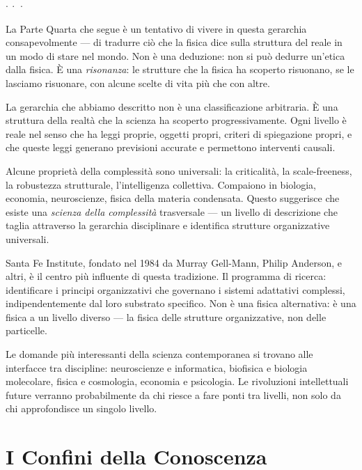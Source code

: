 \documentclass[12pt,a4paper,openany]{book}
\newcommand{\sezione}[1]{\vspace{1.2em}{\large\bfseries #1}\vspace{0.5em}\par}
\newcommand{\puntini}{\begin{center}$\cdot\ \cdot\ \cdot$\end{center}\vspace{0.3em}}
\begin{document}
\puntini

La Parte Quarta che segue è un tentativo di vivere in questa gerarchia consapevolmente --- di tradurre ciò che la fisica dice sulla struttura del reale in un modo di stare nel mondo. Non è una deduzione: non si può dedurre un'etica dalla fisica. È una \textit{risonanza}: le strutture che la fisica ha scoperto risuonano, se le lasciamo risuonare, con alcune scelte di vita più che con altre.

\sezione{La gerarchia come struttura dell'universo e dell'indagine}

La gerarchia che abbiamo descritto non è una classificazione arbitraria. È una struttura della realtà che la scienza ha scoperto progressivamente. Ogni livello è reale nel senso che ha leggi proprie, oggetti propri, criteri di spiegazione propri, e che queste leggi generano previsioni accurate e permettono interventi causali.

Alcune proprietà della complessità sono universali: la criticalità, la scale-freeness, la robustezza strutturale, l'intelligenza collettiva. Compaiono in biologia, economia, neuroscienze, fisica della materia condensata. Questo suggerisce che esiste una \textit{scienza della complessità} trasversale --- un livello di descrizione che taglia attraverso la gerarchia disciplinare e identifica strutture organizzative universali.

Santa Fe Institute, fondato nel 1984 da Murray Gell-Mann, Philip Anderson, e altri, è il centro più influente di questa tradizione. Il programma di ricerca: identificare i principi organizzativi che governano i sistemi adattativi complessi, indipendentemente dal loro substrato specifico. Non è una fisica alternativa: è una fisica a un livello diverso --- la fisica delle strutture organizzative, non delle particelle.

Le domande più interessanti della scienza contemporanea si trovano alle interfacce tra discipline: neuroscienze e informatica, biofisica e biologia molecolare, fisica e cosmologia, economia e psicologia. Le rivoluzioni intellettuali future verranno probabilmente da chi riesce a fare ponti tra livelli, non solo da chi approfondisce un singolo livello.

\clearpage

\chapter{I Confini della Conoscenza}
\end{document}
